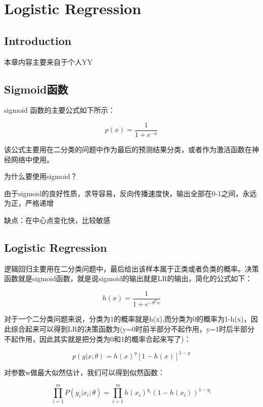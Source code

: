 \chapter{Logistic Regression}

\section*{Introduction}
	本章内容主要来自于个人YY

\section{Sigmoid函数}
	\boldmath  %
	sigmoid 函数的主要公式如下所示：
	
	\begin{equation}
		p(x) = \frac{1}{1+e^{-x}}
	\end{equation}		
	
	该公式主要用在二分类的问题中作为最后的预测结果分类，或者作为激活函数在神经网络中使用。
	
	为什么要使用sigmoid？
	
	由于sigmoid的良好性质，求导容易，反向传播速度快，输出全部在0-1之间，永远为正，严格递增
	
	缺点：在中心点变化快，比较敏感
	

\section{Logistic Regression}
	\boldmath  %
	逻辑回归主要用在二分类问题中，最后给出该样本属于正类或者负类的概率。决策函数就是sigmoid函数，就是说sigmoid的输出就是LR的输出，简化的公式如下：
	
	\begin{equation}
		h(x) = \frac{1}{1+e^{-\theta ^T x}}
	\end{equation}
	
	对于一个二分类问题来说，分类为1的概率就是h(x),而分类为0的概率为1-h(x)，因此综合起来可以得到LR的决策函数为(y=0时前半部分不起作用，y=1时后半部分不起作用，因此其实就是把分类为0和1的概率合起来写了)：
	
	\begin{equation}
		p(y|x;\theta) = h(x)^y [1-h(x)]^{1-y}
	\end{equation}
	
	对参数w做最大似然估计，我们可以得到似然函数：
	
	\begin{equation}
		\prod_{i=1}^m P(y_i|x_i;\theta) = \prod_{i=1}^m h(x_i)^{y_i}(1-h(x_i))^{1-y_i}
	\end{equation}
	
